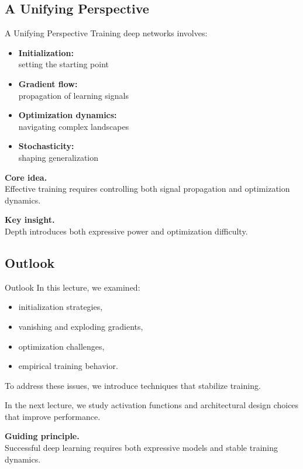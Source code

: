 \documentclass[aspectratio=169,11pt]{beamer}
\begin{document}
\subsection{A Unifying Perspective}
\begin{frame}[t,allowframebreaks]{A Unifying Perspective}
\small
Training deep networks involves:

\begin{itemize}
    \item \textbf{Initialization:}\\ setting the starting point
    \item \textbf{Gradient flow:}\\ propagation of learning signals
    \item \textbf{Optimization dynamics:}\\ navigating complex landscapes
    \item \textbf{Stochasticity:}\\ shaping generalization
\end{itemize}

\textbf{Core idea.}\\ Effective training requires controlling both signal propagation and optimization dynamics.

\textbf{Key insight.}\\ Depth introduces both expressive power and optimization difficulty.
\end{frame}

\subsection{Outlook}
\begin{frame}[t,allowframebreaks]{Outlook}
\small
In this lecture, we examined:

\begin{itemize}
    \item initialization strategies,
    \item vanishing and exploding gradients,
    \item optimization challenges,
    \item empirical training behavior.
\end{itemize}

To address these issues, we introduce techniques that stabilize training.

In the next lecture, we study activation functions and architectural design choices that improve performance.

\textbf{Guiding principle.}\\ Successful deep learning requires both expressive models and stable training dynamics.
\end{frame}
\end{document}
